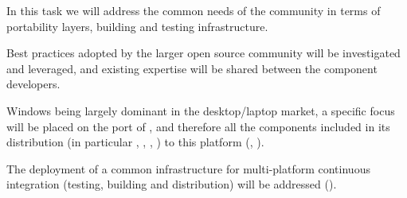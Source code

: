 \begin{workpackage}[id=component-architecture,wphases=0-48!.5,
  title=Component Architecture,lead=UV,
  PSRM=24,UVRM=8,SARM=16, USHRM=4]
\begin{tasklist}
\begin{task}[id=portability,title=Portability,lead=UV,PM=28]
    In this task we will address the common needs of the community in
    terms of portability layers, building and testing infrastructure.

    \begin{compactitem}
    \item Best practices adopted by the larger open source community
      will be investigated and leveraged, and existing expertise will
      be shared between the component developers.
    \item Windows being largely dominant in the desktop/laptop market,
      a specific focus will be placed on the port of \Sage, and
      therefore all the components included in its distribution (in
      particular \PariGP, \GAP, \Singular, \Linbox) to this platform
      (,
      ).
    \item The deployment of a common infrastructure for multi-platform
      continuous integration (testing, building and distribution) will
      be addressed
      ().
    \end{compactitem}

  \end{task}


\end{tasklist}
\end{workpackage}
